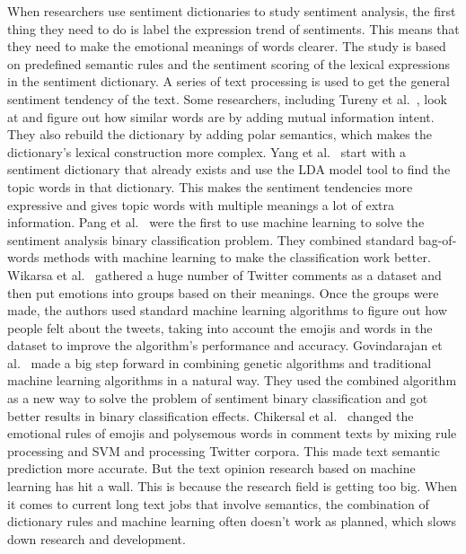 \documentclass[11pt,a4paper]{article}
\begin{document}
When researchers use sentiment dictionaries to study sentiment analysis, the first thing they need to do is label the expression trend of sentiments. This means that they need to make the emotional meanings of words clearer. The study is based on predefined semantic rules and the sentiment scoring of the lexical expressions in the sentiment dictionary. A series of text processing is used to get the general sentiment tendency of the text. Some researchers, including Tureny et al.~\citep{turney2007anatomy}, look at and figure out how similar words are by adding mutual information intent. They also rebuild the dictionary by adding polar semantics, which makes the dictionary's lexical construction more complex. Yang et al.~\citep{chen2013emotional} start with a sentiment dictionary that already exists and use the LDA model tool to find the topic words in that dictionary. This makes the sentiment tendencies more expressive and gives topic words with multiple meanings a lot of extra information. Pang et al.~\citep{pang2002thumbs} were the first to use machine learning to solve the sentiment analysis binary classification problem. They combined standard bag-of-words methods with machine learning to make the classification work better. Wikarsa et al.~\citep{wikarsa2015text} gathered a huge number of Twitter comments as a dataset and then put emotions into groups based on their meanings. Once the groups were made, the authors used standard machine learning algorithms to figure out how people felt about the tweets, taking into account the emojis and words in the dataset to improve the algorithm's performance and accuracy. Govindarajan et al.~\citep{govindarajan2013sentiment} made a big step forward in combining genetic algorithms and traditional machine learning algorithms in a natural way. They used the combined algorithm as a new way to solve the problem of sentiment binary classification and got better results in binary classification effects. Chikersal et al.~\citep{chikersal2015sentu} changed the emotional rules of emojis and polysemous words in comment texts by mixing rule processing and SVM and processing Twitter corpora. This made text semantic prediction more accurate. But the text opinion research based on machine learning has hit a wall. This is because the research field is getting too big. When it comes to current long text jobs that involve semantics, the combination of dictionary rules and machine learning often doesn't work as planned, which slows down research and development.
\end{document}
